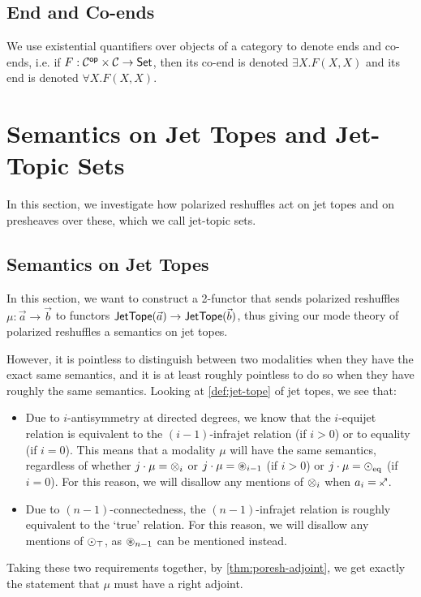 \documentclass[a4paper]{memoir}
\begin{document}
\subsection{End and Co-ends} \label{sec:notations:end}
We use existential quantifiers over objects of a category to denote ends and co-ends, i.e. if $F : {\mathcal{C}}^{\mathsf{op}} \times {\mathcal{C}} \to {\mathsf{Set}}$, then its co-end is denoted $\exists X.F(X, X)$ and its end is denoted $\forall X.F(X, X)$.

\section{Semantics on Jet Topes and Jet-Topic Sets} \label{sec:poresh-jettope-jtset}
In this section, we investigate how polarized reshuffles act on jet topes and on presheaves over these, which we call jet-topic sets.

\subsection{Semantics on Jet Topes} \label{sec:poresh-jettope}
In this section, we want to construct a 2-functor that sends polarized reshuffles $\mu : \vec a \to \vec b$ to functors $\mathsf{JetTope}(\vec a) \to \mathsf{JetTope}(\vec b)$, thus giving our mode theory of polarized reshuffles a semantics on jet topes.

However, it is pointless to distinguish between two modalities when they have the exact same semantics, and it is at least roughly pointless to do so when they have roughly the same semantics.
Looking at \cref{def:jet-tope} of jet topes, we see that:
\begin{itemize}
	\item Due to $i$-antisymmetry at directed degrees, we know that the $i$-equijet relation is equivalent to the $(i-1)$-infrajet relation (if $i > 0$) or to equality (if $i = 0$).
	This means that a modality $\mu$ will have the same semantics, regardless of whether $j \cdot \mu = {\otimes}_i$ or $j \cdot \mu = {\oast}_{i-1}$ (if $i > 0$) or $j \cdot \mu = {\odot}_{\mathrm{eq}}$ (if $i = 0$).
	For this reason, we will disallow any mentions of ${\otimes}_i$ when $a_i = \ypolar$.
	
	\item Due to $(n-1)$-connectedness, the $(n-1)$-infrajet relation is roughly equivalent to the `true' relation.
	For this reason, we will disallow any mentions of ${\odot}_\top$, as ${\oast}_{n-1}$ can be mentioned instead.
\end{itemize}
Taking these two requirements together, by \cref{thm:poresh-adjoint}, we get exactly the statement that $\mu$ must have a right adjoint.
\end{document}

